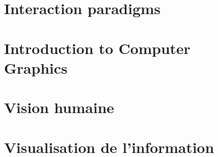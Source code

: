 \documentclass[a4paper,11pt]{article}
\theoremstyle{theorem-style}  %
\theoremstyle{definition-style}
\begin{document}
\tableofcontents
\section{Interaction paradigms}

\section{Introduction to Computer Graphics}

\section{Vision humaine}

\section{Visualisation de l'information}

\end{document}
